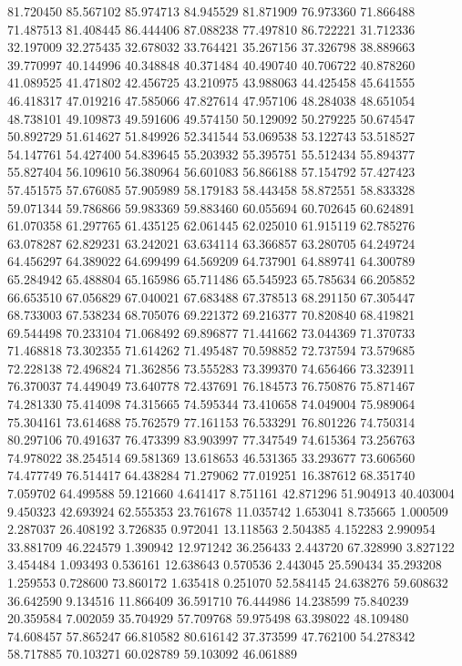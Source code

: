 81.720450
85.567102
85.974713
84.945529
81.871909
76.973360
71.866488
71.487513
81.408445
86.444406
87.088238
77.497810
86.722221
31.712336
32.197009
32.275435
32.678032
33.764421
35.267156
37.326798
38.889663
39.770997
40.144996
40.348848
40.371484
40.490740
40.706722
40.878260
41.089525
41.471802
42.456725
43.210975
43.988063
44.425458
45.641555
46.418317
47.019216
47.585066
47.827614
47.957106
48.284038
48.651054
48.738101
49.109873
49.591606
49.574150
50.129092
50.279225
50.674547
50.892729
51.614627
51.849926
52.341544
53.069538
53.122743
53.518527
54.147761
54.427400
54.839645
55.203932
55.395751
55.512434
55.894377
55.827404
56.109610
56.380964
56.601083
56.866188
57.154792
57.427423
57.451575
57.676085
57.905989
58.179183
58.443458
58.872551
58.833328
59.071344
59.786866
59.983369
59.883460
60.055694
60.702645
60.624891
61.070358
61.297765
61.435125
62.061445
62.025010
61.915119
62.785276
63.078287
62.829231
63.242021
63.634114
63.366857
63.280705
64.249724
64.456297
64.389022
64.699499
64.569209
64.737901
64.889741
64.300789
65.284942
65.488804
65.165986
65.711486
65.545923
65.785634
66.205852
66.653510
67.056829
67.040021
67.683488
67.378513
68.291150
67.305447
68.733003
67.538234
68.705076
69.221372
69.216377
70.820840
68.419821
69.544498
70.233104
71.068492
69.896877
71.441662
73.044369
71.370733
71.468818
73.302355
71.614262
71.495487
70.598852
72.737594
73.579685
72.228138
72.496824
71.362856
73.555283
73.399370
74.656466
73.323911
76.370037
74.449049
73.640778
72.437691
76.184573
76.750876
75.871467
74.281330
75.414098
74.315665
74.595344
73.410658
74.049004
75.989064
75.304161
73.614688
75.762579
77.161153
76.533291
76.801226
74.750314
80.297106
70.491637
76.473399
83.903997
77.347549
74.615364
73.256763
74.978022
38.254514
69.581369
13.618653
46.531365
33.293677
73.606560
74.477749
76.514417
64.438284
71.279062
77.019251
16.387612
68.351740
7.059702
64.499588
59.121660
4.641417
8.751161
42.871296
51.904913
40.403004
9.450323
42.693924
62.555353
23.761678
11.035742
1.653041
8.735665
1.000509
2.287037
26.408192
3.726835
0.972041
13.118563
2.504385
4.152283
2.990954
33.881709
46.224579
1.390942
12.971242
36.256433
2.443720
67.328990
3.827122
3.454484
1.093493
0.536161
12.638643
0.570536
2.443045
25.590434
35.293208
1.259553
0.728600
73.860172
1.635418
0.251070
52.584145
24.638276
59.608632
36.642590
9.134516
11.866409
36.591710
76.444986
14.238599
75.840239
20.359584
7.002059
35.704929
57.709768
59.975498
63.398022
48.109480
74.608457
57.865247
66.810582
80.616142
37.373599
47.762100
54.278342
58.717885
70.103271
60.028789
59.103092
46.061889
